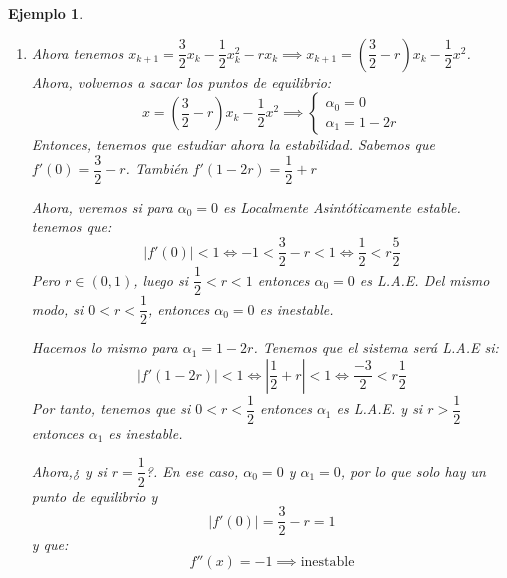\documentclass[11pt, a4paper]{article}
\newif\IfInSansMode
\numberwithin{equation}{section}
\theoremstyle{theorem-style}
\theoremstyle{definition-style}
\theoremstyle{remark-style}
\theoremstyle{example-style}
\newtheorem{ejemplo}{Ejemplo}[section]
\begin{document}
\begin{ejemplo}
\begin{enumerate}
	Por tanto, tenemos que tomar un $x_0$. Sabemos que $\alpha_1 < x_0$ pues de lo contrario, la población de peces se extinguiría. Así:
	\[
	\frac{1 - \sqrt{1-8b}}{2} < x_0 \implies b < \dfrac{1}{2}x_0 -(1-x_0)
	\]
	De esta forma, para llegar al punto de equilibrio A.E., hay que tomar $0 < b < min\{\ \dfrac{1}{8},\ \dfrac{1}{2}x_0 -(1-x_0) \}$
	
	Ahora, si $b= \dfrac{1}{8}$, entonces $\alpha_0 = \alpha_1 = \dfrac{1}{2}$ y $f'(\dfrac{1}{2}) = 1$ y $f''(x) = -1 < 0 \implies \alpha= \dfrac{1}{2}$ es inestable
	
	Por tanto, si tomáramos $x_0 > \dfrac{1}{2} \implies x_k$ converge hacia $\dfrac{1}{2} = \alpha$.
	Si tomáramos $x_0 < \dfrac{1}{2} \implies x_k$ diverge negativamente.
	
	\item Ahora tenemos $x_{k+1}= \dfrac{3}{2}x_k - \dfrac{1}{2} x_k^2 -rx_k \implies x_{k+1} = (\dfrac{3}{2}-r)x_k - \dfrac{1}{2}x^2$.
	Ahora, volvemos a sacar los puntos de equilibrio:
	\[
	x = (\dfrac{3}{2}-r)x_k - \dfrac{1}{2}x^2 \implies \begin{cases}
	\alpha_0 = 0\\
	\alpha_1 = 1-2r
\end{cases}
	\]
	Entonces, tenemos que estudiar ahora la estabilidad. Sabemos que $f'(0) = \dfrac{3}{2} -r$. También $f'(1-2r) = \dfrac{1}{2} + r$
	
	Ahora, veremos si para $\alpha_0 = 0$ es Localmente Asintóticamente estable. tenemos que:
	\[
	|f'(0)|<1 \iff -1 < \dfrac{3}{2}-r < 1 \iff \dfrac{1}{2} < r \dfrac{5}{2}
	\]
	Pero $r \in (0,1)$, luego si $\dfrac{1}{2} < r < 1$ entonces $\alpha_0 = 0$ es L.A.E. Del mismo modo, si $0 < r < \dfrac{1}{2}$, entonces $\alpha_0 = 0$ es inestable.
	
	Hacemos lo mismo para $\alpha_1 = 1-2r$.  Tenemos que el sistema será L.A.E si:
	\[
	|f'(1-2r)| < 1 \iff |\dfrac{1}{2}+r| < 1 \iff \dfrac{-3}{2} < r \dfrac{1}{2}
	\]
	Por tanto, tenemos que si $0 < r < \dfrac{1}{2}$ entonces $\alpha_1$ es L.A.E. y si $r> \dfrac{1}{2}$ entonces $\alpha_1$ es inestable.
	
	Ahora,¿ y si $r= \dfrac{1}{2}$?. En ese caso, $\alpha_0 = 0$ y $\alpha_1 = 0$, por lo que solo hay un punto de equilibrio y
	\[
	|f'(0)|= \dfrac{3}{2}-r = 1
	\]
	y que:
	\[
	f''(x) =  -1 \implies \text{inestable}
	\]
\end{enumerate}
\end{ejemplo}


\end{document}
